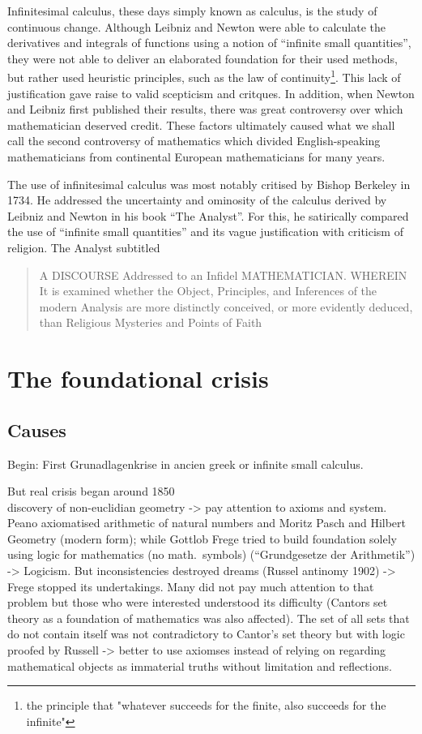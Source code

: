 \documentclass[hidelinks]{article}
\theoremstyle{plain}
\theoremstyle{definition}
\theoremstyle{rem}
\begin{document}
Infinitesimal calculus, these days simply known as calculus, is the study of continuous change. Although Leibniz and Newton were able to calculate the derivatives and integrals of functions using a notion of ``infinite small quantities'', they were not able to deliver an elaborated foundation for their used methods, but rather used heuristic principles, such as the law of continuity\footnote{the principle that "whatever succeeds for the finite, also succeeds for the infinite"}.  This lack of justification gave raise to valid scepticism and critques. In addition, when Newton and Leibniz first published their results, there was great controversy over which mathematician deserved credit. These factors ultimately caused what we shall call the second controversy of mathematics which divided English-speaking mathematicians from continental European mathematicians for many years. 

The use of infinitesimal calculus was most notably critised by Bishop Berkeley in 1734. He addressed the uncertainty and ominosity of the calculus derived by Leibniz and Newton in his book ``The Analyst''. For this, he satirically compared the use of ``infinite small quantities'' and its vague justification with criticism of religion. The Analyst subtitled
\begin{quote}
A DISCOURSE Addressed to an Infidel MATHEMATICIAN\@. WHEREIN It is examined whether the Object, Principles, and Inferences of the modern Analysis are more distinctly conceived, or more evidently deduced, than Religious Mysteries and Points of Faith
\end{quote}



\section{The foundational crisis}
\subsection{Causes}\label{ssec_causes}

Begin: First Grunadlagenkrise in ancien greek or infinite small calculus.

But real crisis began around 1850\\
discovery of non-euclidian geometry -> pay attention to axioms and system.\\
Peano axiomatised arithmetic of natural numbers and Moritz Pasch and Hilbert Geometry (modern form); while Gottlob Frege tried to build foundation solely using logic for mathematics (no math.\ symbols) (``Grundgesetze der Arithmetik'') -> Logicism. But inconsistencies destroyed dreams (Russel antinomy 1902) -> Frege stopped its undertakings.
Many did not pay much attention to that problem but those who were interested understood its difficulty (Cantors set theory as a foundation of mathematics was also affected).
The set of all sets that do not contain itself was not contradictory to Cantor's set theory but with logic proofed by Russell -> better to use axiomses instead of relying on regarding mathematical objects as immaterial truths without limitation and reflections.\\
\end{document}
